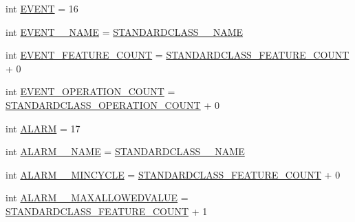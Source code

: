 \begin{DoxyCompactItemize}
int \hyperlink{interfaceshootingmachineemfmodel_1_1_shootingmachineemfmodel_package_a17975c136ffb7a00885baefd2d0a6f3c}{E\-V\-E\-N\-T} = 16
\item 
int \hyperlink{interfaceshootingmachineemfmodel_1_1_shootingmachineemfmodel_package_adfb3c7d591083a0612fbcc21fc2b44fa}{E\-V\-E\-N\-T\-\_\-\-\_\-\-N\-A\-M\-E} = \hyperlink{interfaceshootingmachineemfmodel_1_1_shootingmachineemfmodel_package_a06475d7d54d52ee19b2aaf4d5d73c738}{S\-T\-A\-N\-D\-A\-R\-D\-C\-L\-A\-S\-S\-\_\-\-\_\-\-N\-A\-M\-E}
\item 
int \hyperlink{interfaceshootingmachineemfmodel_1_1_shootingmachineemfmodel_package_a3d4f3c28358c982d394cd32df420a857}{E\-V\-E\-N\-T\-\_\-\-F\-E\-A\-T\-U\-R\-E\-\_\-\-C\-O\-U\-N\-T} = \hyperlink{interfaceshootingmachineemfmodel_1_1_shootingmachineemfmodel_package_a14037f66989b3107e402142df96ee9aa}{S\-T\-A\-N\-D\-A\-R\-D\-C\-L\-A\-S\-S\-\_\-\-F\-E\-A\-T\-U\-R\-E\-\_\-\-C\-O\-U\-N\-T} + 0
\item 
int \hyperlink{interfaceshootingmachineemfmodel_1_1_shootingmachineemfmodel_package_a24a1efdc251910cf4131efe9e2fee313}{E\-V\-E\-N\-T\-\_\-\-O\-P\-E\-R\-A\-T\-I\-O\-N\-\_\-\-C\-O\-U\-N\-T} = \hyperlink{interfaceshootingmachineemfmodel_1_1_shootingmachineemfmodel_package_a2fe5d848cfe0a02fe5609e2c5ed7e7c7}{S\-T\-A\-N\-D\-A\-R\-D\-C\-L\-A\-S\-S\-\_\-\-O\-P\-E\-R\-A\-T\-I\-O\-N\-\_\-\-C\-O\-U\-N\-T} + 0
\item 
int \hyperlink{interfaceshootingmachineemfmodel_1_1_shootingmachineemfmodel_package_adae05455839bcd40f9790082ac94aabc}{A\-L\-A\-R\-M} = 17
\item 
int \hyperlink{interfaceshootingmachineemfmodel_1_1_shootingmachineemfmodel_package_a14df867c3b2b595f2fa93d35083e8097}{A\-L\-A\-R\-M\-\_\-\-\_\-\-N\-A\-M\-E} = \hyperlink{interfaceshootingmachineemfmodel_1_1_shootingmachineemfmodel_package_a06475d7d54d52ee19b2aaf4d5d73c738}{S\-T\-A\-N\-D\-A\-R\-D\-C\-L\-A\-S\-S\-\_\-\-\_\-\-N\-A\-M\-E}
\item 
int \hyperlink{interfaceshootingmachineemfmodel_1_1_shootingmachineemfmodel_package_a3c7a7e962d5ba6ac8ce25359ed7838ef}{A\-L\-A\-R\-M\-\_\-\-\_\-\-M\-I\-N\-C\-Y\-C\-L\-E} = \hyperlink{interfaceshootingmachineemfmodel_1_1_shootingmachineemfmodel_package_a14037f66989b3107e402142df96ee9aa}{S\-T\-A\-N\-D\-A\-R\-D\-C\-L\-A\-S\-S\-\_\-\-F\-E\-A\-T\-U\-R\-E\-\_\-\-C\-O\-U\-N\-T} + 0
\item 
int \hyperlink{interfaceshootingmachineemfmodel_1_1_shootingmachineemfmodel_package_ad64f07394942e2a562b274dda08a2992}{A\-L\-A\-R\-M\-\_\-\-\_\-\-M\-A\-X\-A\-L\-L\-O\-W\-E\-D\-V\-A\-L\-U\-E} = \hyperlink{interfaceshootingmachineemfmodel_1_1_shootingmachineemfmodel_package_a14037f66989b3107e402142df96ee9aa}{S\-T\-A\-N\-D\-A\-R\-D\-C\-L\-A\-S\-S\-\_\-\-F\-E\-A\-T\-U\-R\-E\-\_\-\-C\-O\-U\-N\-T} + 1

\end{DoxyCompactItemize}
